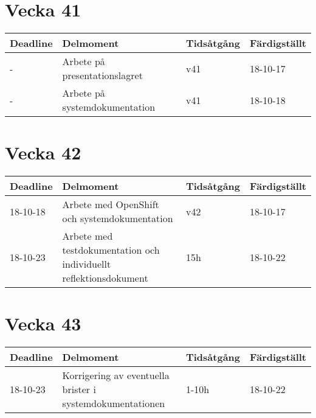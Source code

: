 \documentclass{TDP003mall}
\begin{document}
\section{Vecka 41}
\begin{table}[!h]
\begin{tabularx}{\linewidth}{l|X|l|l}
\hline
Deadline & Delmoment & Tidsåtgång & Färdigställt\\\hline
- & Arbete på presentationslagret & v41 & 18-10-17\\\hline
- & Arbete på systemdokumentation & v41 & 18-10-18\\\hline
\end{tabularx}
\end{table}

\newpage
\section{Vecka 42}
\begin{table}[!h]
\begin{tabularx}{\linewidth}{l|X|l|l}
\hline
Deadline & Delmoment & Tidsåtgång & Färdigställt\\\hline
18-10-18 & Arbete med OpenShift och systemdokumentation & v42 & 18-10-17\\\hline
18-10-23 & Arbete med testdokumentation och individuellt reflektionsdokument & 15h & 18-10-22\\\hline
\end{tabularx}
\end{table}

\section{Vecka 43}
\begin{table}[!h]
\begin{tabularx}{\linewidth}{l|X|l|l}
\hline
Deadline & Delmoment & Tidsåtgång & Färdigställt\\\hline
18-10-23 & Korrigering av eventuella brister i systemdokumentationen & 1-10h & 18-10-22\\\hline
\end{tabularx}
\end{table}
\end{document}
